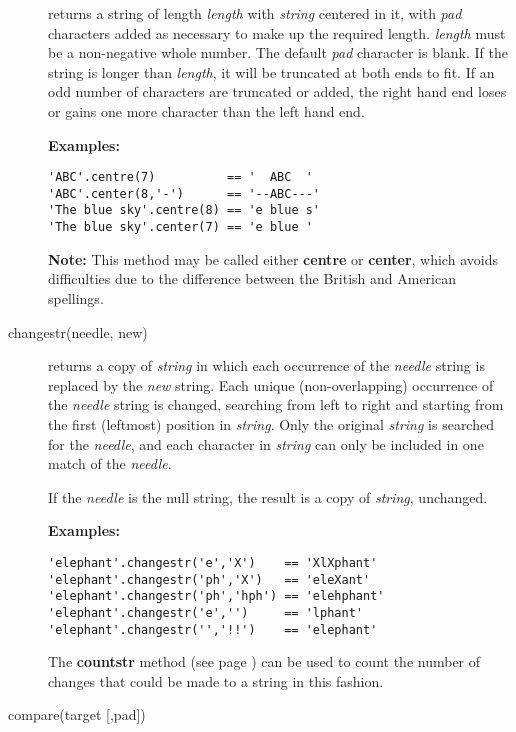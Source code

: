 \begin{description}
returns a string of length \emph{length} with \emph{string}
centered in it, with \emph{pad} characters added as necessary to
make up the required length.
\emph{length} must be a non-negative whole number.
The default \emph{pad} character is blank.
If the string is longer than \emph{length}, it will be truncated at
both ends to fit.
If an odd number of characters are truncated or added, the right hand
end loses or gains one more character than the left hand end.
 
\textbf{Examples:}
\begin{lstlisting}
'ABC'.centre(7)          == '  ABC  '
'ABC'.center(8,'-')      == '--ABC---'
'The blue sky'.centre(8) == 'e blue s'
'The blue sky'.center(7) == 'e blue '
\end{lstlisting}
\textbf{Note: }This method may be called either \textbf{centre} or \textbf{center},
which avoids difficulties due to the difference between the British and
American spellings.
\item[changestr(needle, new)]\label{refchastr}

returns a copy of \emph{string} in which each occurrence of the
\emph{needle} string is replaced by the \emph{new} string.
Each unique (non-overlapping) occurrence of the \emph{needle} string
is changed, searching from left to right and starting from the first
(leftmost) position in \emph{string}.
Only the original \emph{string} is searched for the
\emph{needle}, and each character in \emph{string} can only be
included in one match of the \emph{needle}.
 
If the \emph{needle} is the null string, the result is a copy of
\emph{string}, unchanged.
 
\textbf{Examples:}
\begin{lstlisting}
'elephant'.changestr('e','X')    == 'XlXphant'
'elephant'.changestr('ph','X')   == 'eleXant'
'elephant'.changestr('ph','hph') == 'elehphant'
'elephant'.changestr('e','')     == 'lphant'
'elephant'.changestr('','!!')    == 'elephant'
\end{lstlisting}
 The  \textbf{countstr} method (see page \pageref{refcoustr})  can be used to
count the number of changes that could be made to a string in this
fashion.
\item[compare(target [,pad{]})]\label{refcompar}


\end{description}

